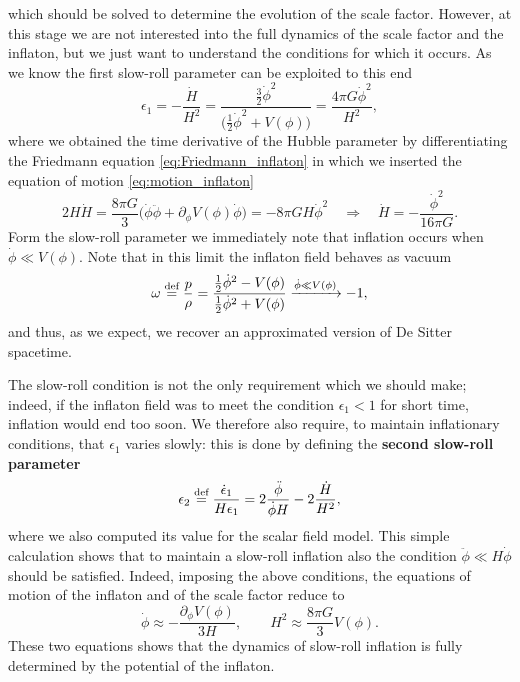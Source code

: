 which should be solved to determine the evolution of the scale factor. However, at this stage we are not interested into the full dynamics of the scale factor and the inflaton, but we just want to understand the conditions for which it occurs. As we know the first slow-roll parameter can be exploited to this end
\begin{equation}
    \epsilon_1=-\frac{\dot H}{H^2}=\frac{\frac{3}{2}\dot\phi^2}{\big(\frac{1}{2}\dot\phi^2+V(\phi)\big)}=\frac{4\pi G\dot\phi^2}{H^2},\label{eq:SRP_field}
\end{equation}
where we obtained the time derivative of the Hubble parameter by differentiating the Friedmann equation \eqref{eq:Friedmann_inflaton} in which we inserted the equation of motion \eqref{eq:motion_inflaton}
$$2H\dot H=\frac{8\pi G}{3}\bigg(\dot\phi\ddot\phi+\partial_\phi V(\phi)\dot\phi\bigg)=-8\pi GH\dot \phi^2\quad\Rightarrow\quad \boxed{\dot H=-\frac{\dot \phi^2}{16\pi G}}.$$
Form the slow-roll parameter we immediately note that inflation occurs when $\dot \phi\ll V(\phi)$. Note that in this limit the inflaton field behaves as vacuum $$\omega\stackrel{\text{def}}{=}\frac{p}{\rho}=\frac{\frac{1}{2}\dot\phi^2-V(\phi)}{\frac{1}{2}\dot\phi^2+V(\phi)}\xrightarrow{\dot\phi\ll V(\phi)}-1,$$
and thus, as we expect, we recover an approximated version of De Sitter spacetime.

The slow-roll condition is not the only requirement which we should make; indeed, if the inflaton field was to meet the condition $\epsilon_1<1$ for short time, inflation would end too soon. We therefore also require, to maintain inflationary conditions, that $\epsilon_1$ varies slowly: this is done by defining the \textbf{second slow-roll parameter}
\begin{equation}
    \epsilon_2\stackrel{\text{def}}{=}\frac{\dot\epsilon_1}{H\epsilon_1}=2\frac{\ddot\phi}{\dot\phi H}-2\frac{\dot H}{H^2},\label{eq:second_sr_parameter}
\end{equation}
where we also computed its value for the scalar field model. This simple calculation shows that to maintain a slow-roll inflation also the condition $\ddot\phi\ll H\dot\phi$ should be satisfied. Indeed, imposing the above conditions, the equations of motion of the inflaton and of the scale factor reduce to
\begin{equation}
    \label{eq:SR_equation_motion}
    \dot\phi \approx-\frac{\partial_\phi V(\phi)}{3H},\qquad H^2\approx\frac{8\pi G}{3}V(\phi).
\end{equation}
These two equations shows that the dynamics of slow-roll inflation is fully determined by the potential of the inflaton. 
